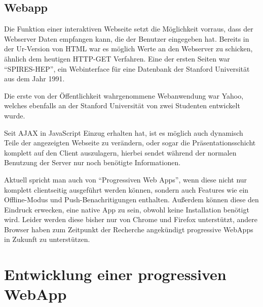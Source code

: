 \documentclass[a4paper,12pt]{scrartcl}      %
\let\oldcite\cite
\renewcommand{\cite}[1]{\textsuperscript{\oldcite{#1}}}
\begin{document}
	\subsection{Webapp}
	Die Funktion einer interaktiven Webseite setzt die Möglichkeit vorraus, dass der Webserver Daten empfangen kann, die der Benutzer eingegeben hat. Bereits in der Ur-Version von HTML war es möglich Werte an den Webserver zu schicken, ähnlich dem heutigen HTTP-GET Verfahren. Eine der ersten Seiten war ``SPIRES-HEP'', ein Webinterface für eine Datenbank der Stanford Universität aus dem Jahr 1991.\par
	Die erste von der Öffentlichkeit wahrgenommene Webanwendung war Yahoo, welches ebenfalls an der Stanford Universität von zwei Studenten entwickelt wurde.\par
	Seit AJAX in JavaScript Einzug erhalten hat, ist es möglich auch dynamisch Teile der angezeigten Webseite zu verändern, oder sogar die Präsentationsschicht komplett auf den Client auszulagern, hierbei sendet während der normalen Benutzung der Server nur noch benötigte Informationen.\cite{webappWiki}\par
	Aktuell spricht man auch von ``Progressiven Web Apps'', wenn diese nicht nur komplett clientseitig ausgeführt werden können, sondern auch Features wie ein Offline-Modus und Push-Benachritigungen enthalten. Außerdem können diese den Eindruck erwecken, eine native App zu sein, obwohl keine Installation benötigt wird. Leider werden diese bisher nur von Chrome und Firefox unterstützt, andere Browser haben zum Zeitpunkt der Recherche angekündigt progressive WebApps in Zukunft zu unterstützen.\cite{prwebappWiki}\par
	
	\newpage
	\section{Entwicklung einer progressiven WebApp}
\end{document}
